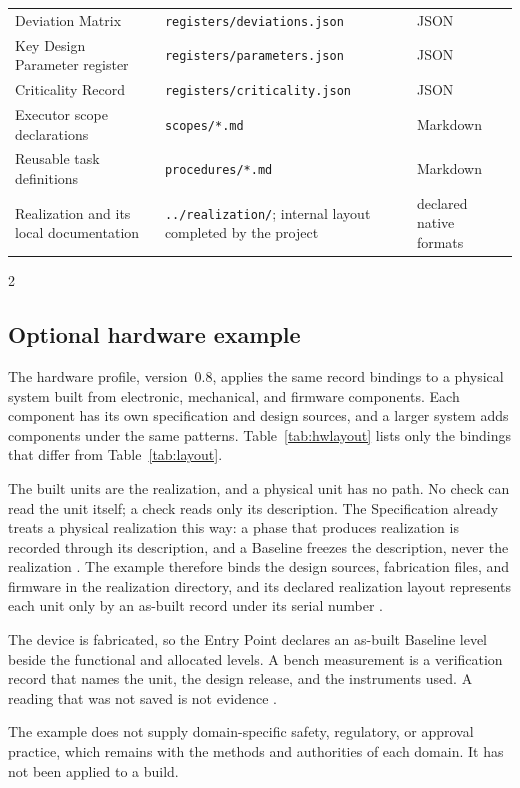\begin{longtable}{@{}p{} >{\raggedright\arraybackslash}p{} p{}@{}}
Deviation Matrix & \texttt{registers/deviations.json} & JSON \\
Key Design Parameter register & \texttt{registers/parameters.json} & JSON \\
Criticality Record & \texttt{registers/criticality.json} & JSON \\
Executor scope declarations & \texttt{scopes/*.md} & Markdown \\
Reusable task definitions & \texttt{procedures/*.md} & Markdown \\
Realization and its local documentation & \texttt{../realization/}; internal layout completed by the project & declared native formats \\
\bottomrule
\end{longtable}
\endgroup

\begin{multicols}{2}
\subsection{Optional hardware example}

The hardware profile, version~0.8, applies the same record bindings to a physical system built from electronic, mechanical, and firmware components. Each component has its own specification and design sources, and a larger system adds components under the same patterns. Table~\ref{tab:hwlayout} lists only the bindings that differ from Table~\ref{tab:layout}.

The built units are the realization, and a physical unit has no path. No check can read the unit itself; a check reads only its description. The Specification already treats a physical realization this way: a phase that produces realization is recorded through its description, and a Baseline freezes the description, never the realization \citep[Sections~\hyperlink{nss-8.1}{8.1} and~\hyperlink{nss-9.1}{9.1}]{pss2026}. The example therefore binds the design sources, fabrication files, and firmware in the realization directory, and its declared realization layout represents each unit only by an as-built record under its serial number \citep[Section~\hyperlink{nss-14.8}{14.8}]{pss2026}.

The device is fabricated, so the Entry Point declares an as-built Baseline level beside the functional and allocated levels. A bench measurement is a verification record that names the unit, the design release, and the instruments used. A reading that was not saved is not evidence \citep[Sections~\hyperlink{nss-7.18}{7.18} and~\hyperlink{nss-9.1}{9.1}]{pss2026}.

The example does not supply domain-specific safety, regulatory, or approval practice, which remains with the methods and authorities of each domain. It has not been applied to a build.
\end{multicols}

